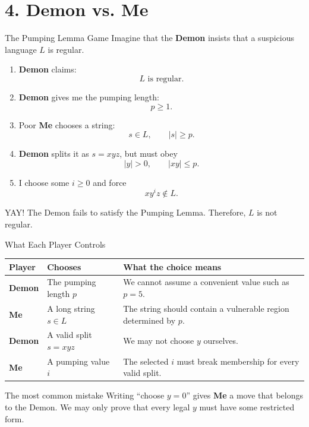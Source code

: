 \documentclass[10pt,aspectratio=169]{beamer}
\newcommand{\Demon}{\textbf{\alert{Demon}}}
\newcommand{\Me}{\textbf{\color{blue!70!black}Me}}
\begin{document}
\section{4. Demon vs. Me}

\begin{frame}{The Pumping Lemma Game}
\small
Imagine that the \Demon{} insists that a suspicious language $L$ is regular.

\begin{enumerate}
    \item \Demon{} claims:
    \[
    L\text{ is regular.}
    \]

    \item \Demon{} gives me the pumping length:
    \[
    p\geq 1.
    \]

    \item Poor \Me{} chooses a string:
    \[
    s\in L,
    \qquad |s|\geq p.
    \]

    \item \Demon{} splits it as $s=xyz$, but must obey
    \[
    |y|>0,
    \qquad |xy|\leq p.
    \]

    \item I choose some $i\geq 0$ and force
    \[
    xy^iz\notin L.
    \]
\end{enumerate}

\begin{block}{YAY!}
The Demon fails to satisfy the Pumping Lemma. Therefore, $L$ is not regular.
\end{block}
\end{frame}

\begin{frame}{What Each Player Controls}
\scriptsize
\renewcommand{\arraystretch}{1.35}
\begin{center}
\begin{tabular}{p{2.5cm}p{4.4cm}p{6.1cm}}
\toprule
\textbf{Player} & \textbf{Chooses} & \textbf{What the choice means} \\
\midrule
\Demon & The pumping length $p$ & We cannot assume a convenient value such as $p=5$. \\
\Me & A long string $s\in L$ & The string should contain a vulnerable region determined by $p$. \\
\Demon & A valid split $s=xyz$ & We may not choose $y$ ourselves. \\
\Me & A pumping value $i$ & The selected $i$ must break membership for every valid split. \\
\bottomrule
\end{tabular}
\end{center}

\begin{alertblock}{The most common mistake}
Writing ``choose $y=0$'' gives \Me{} a move that belongs to the Demon.
We may only prove that every legal $y$ must have some restricted form.
\end{alertblock}
\end{frame}
\end{document}

